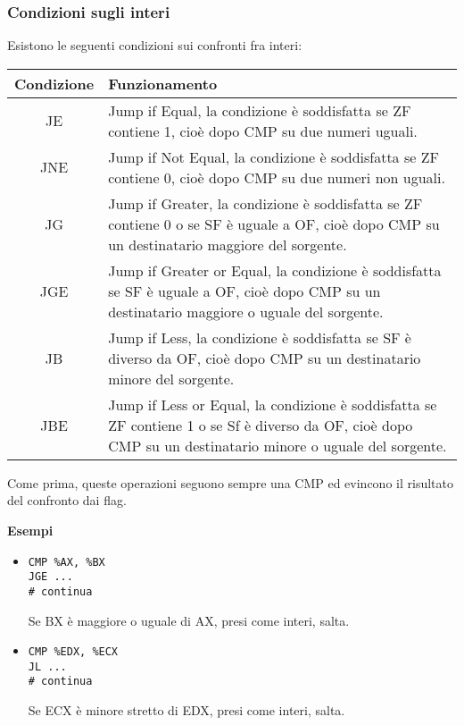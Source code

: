 \documentclass[a4paper,11pt]{article}
\begin{document}
\subsubsection{Condizioni sugli interi}
Esistono le seguenti condizioni sui confronti fra interi:

\begin{table}[h!]
	\center {}
	\begin{tabular} { c  p{10cm} }
		\bfseries Condizione & \bfseries Funzionamento \\
		\hline 
		JE & Jump if Equal, la condizione è soddisfatta se ZF contiene 1, cioè dopo CMP su due numeri uguali. \\
		JNE & Jump if Not Equal, la condizione è soddisfatta se ZF contiene 0, cioè dopo CMP su due numeri non uguali. \\ 
		JG & Jump if Greater, la condizione è soddisfatta se ZF contiene 0 o se SF è uguale a OF, cioè dopo CMP su un destinatario maggiore del sorgente. \\
		JGE & Jump if Greater or Equal, la condizione è soddisfatta se SF è uguale a OF, cioè dopo CMP su un destinatario maggiore o uguale del sorgente. \\ 
		JB & Jump if Less, la condizione è soddisfatta se SF è diverso da OF, cioè dopo CMP su un destinatario minore del sorgente. \\
		JBE & Jump if Less or Equal, la condizione è soddisfatta se ZF contiene 1 o se Sf è diverso da OF, cioè dopo CMP su un destinatario minore o uguale del sorgente. \\ 
	\end{tabular}
\end{table}

Come prima, queste operazioni seguono sempre una CMP ed evincono il risultato del confronto dai flag.

\par\medskip
\noindent
\textbf{\textsf{Esempi}} \\
\begin{itemize}
	\item 
\begin{lstlisting}[language=assembler,style=codestyle]	
CMP %AX, %BX
JGE ...
# continua
\end{lstlisting}
Se BX è maggiore o uguale di AX, presi come interi, salta.

	\item 
\begin{lstlisting}[language=assembler,style=codestyle]	
CMP %EDX, %ECX
JL ...
# continua
\end{lstlisting}
Se ECX è minore stretto di EDX, presi come interi, salta.
\end{itemize}
\end{document}
